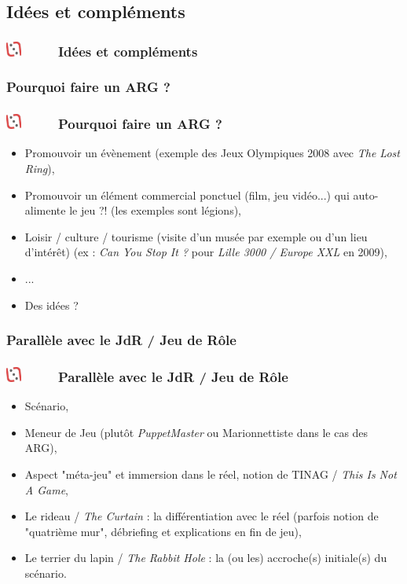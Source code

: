 \documentclass[slidetop,11pt]{beamer}
\def\moreInFrameTitleLeftt{\includegraphics[height=0.5cm]{img/ligueludique-0.png}~~~~~}
\begin{document}
\def\sectionPartIIc{Id{\'e}es et compl{\'e}ments}
\subsection{\sectionPartIIc} %
\begin{frame}
	\frametitle{\moreInFrameTitleLeftt \sectionPartIIc }
	\tableofcontents[sections=2,currentsection,subsectionstyle=show/shaded/hide]
\end{frame} 

\def\sectionPartIIcI{Pourquoi faire un ARG ?}
\subsubsection{\sectionPartIIcI} %
\begin{frame}
	\frametitle{\moreInFrameTitleLeftt \sectionPartIIcI }
	\begin{itemize}
		\item Promouvoir un {\'e}v{\`e}nement (exemple des Jeux Olympiques 2008 avec \emph{The Lost Ring}), 
		\item Promouvoir un {\'e}l{\'e}ment commercial ponctuel (film, jeu vid{\'e}o...) qui auto-alimente le jeu ?! (les exemples sont l{\'e}gions), 
		\item Loisir / culture / tourisme (visite d'un mus{\'e}e par exemple ou d'un lieu d'int{\'e}r{\^e}t) (ex : \emph{Can You Stop It ?} pour \emph{Lille 3000 / Europe XXL} en 2009), 
		\item[] ...
		\item Des id{\'e}es ?
	\end{itemize}
\end{frame} 

\def\sectionPartIIcII{Parall{\`e}le avec le JdR / Jeu de R{\^o}le}
\subsubsection{\sectionPartIIcII} %
\begin{frame}
	\frametitle{\moreInFrameTitleLeftt \sectionPartIIcII }
	\begin{itemize}
		\item Sc{\'e}nario, 
		\item Meneur de Jeu (plut{\^o}t \emph{PuppetMaster} ou Marionnettiste dans le cas des ARG), 
		\item Aspect "m{\'e}ta-jeu" et immersion dans le r{\'e}el, notion de TINAG / \emph{This Is Not A Game}, 
		\item Le rideau / \emph{The Curtain} : la diff{\'e}rentiation avec le r{\'e}el (parfois notion de "quatri{\`e}me mur", d{\'e}briefing et explications en fin de jeu), 
		\item Le terrier du lapin / \emph{The Rabbit Hole} : la (ou les) accroche(s) initiale(s) du sc{\'e}nario. 
	\end{itemize}
\end{frame} 
\end{document}
